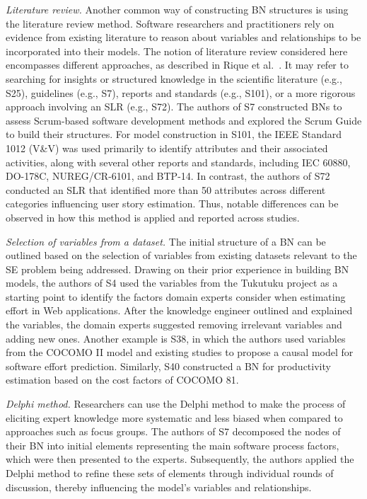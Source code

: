 \textit{Literature review.} Another common way of constructing BN structures is using the literature review method. Software researchers and practitioners rely on evidence from existing literature to reason about variables and relationships to be incorporated into their models. The notion of literature review considered here encompasses different approaches, as described in Rique et al.~\cite{rique2025constructing}. It may refer to searching for insights or structured knowledge in the scientific literature (e.g., S25), guidelines (e.g., S7), reports and standards (e.g., S101), or a more rigorous approach involving an SLR (e.g., S72). The authors of S7 constructed BNs to assess Scrum-based software development methods and explored the Scrum Guide to build their structures. For model construction in S101, the IEEE Standard 1012 (V\&V) was used primarily to identify attributes and their associated activities, along with several other reports and standards, including IEC 60880, DO-178C, NUREG/CR-6101, and BTP-14. In contrast, the authors of S72 conducted an SLR that identified more than 50 attributes across different categories influencing user story estimation. Thus, notable differences can be observed in how this method is applied and reported across studies.

\textit{Selection of variables from a dataset.} The initial structure of a BN can be outlined based on the selection of variables from existing datasets relevant to the SE problem being addressed. Drawing on their prior experience in building BN models, the authors of S4 used the variables from the Tukutuku project as a starting point to identify the factors domain experts consider when estimating effort in Web applications. After the knowledge engineer outlined and explained the variables, the domain experts suggested removing irrelevant variables and adding new ones. Another example is S38, in which the authors used variables from the COCOMO II model and existing studies to propose a causal model for software effort prediction. Similarly, S40 constructed a BN for productivity estimation based on the cost factors of COCOMO 81.

\textit{Delphi method.} Researchers can use the Delphi method to make the process of eliciting expert knowledge more systematic and less biased when compared to approaches such as focus groups. The authors of S7 decomposed the nodes of their BN into initial elements representing the main software process factors, which were then presented to the experts. Subsequently, the authors applied the Delphi method to refine these sets of elements through individual rounds of discussion, thereby influencing the model's variables and relationships.

